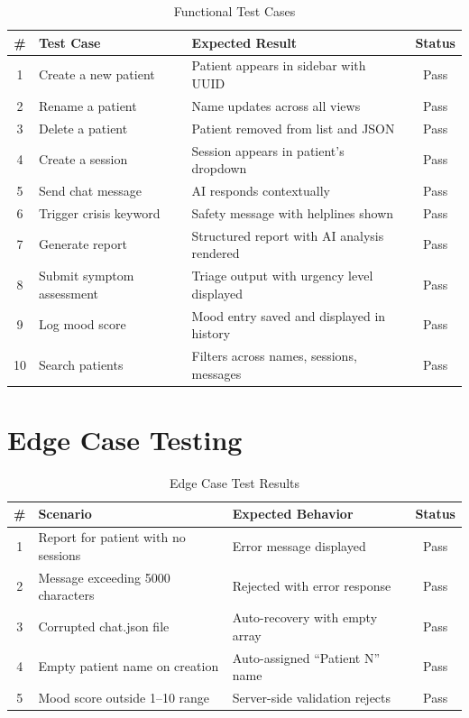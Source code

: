 \documentclass[12pt,a4paper]{report}
\begin{document}
\begin{table}[h!]
\centering
\caption{Functional Test Cases}
\begin{tabularx}{\textwidth}{|c|X|X|c|}
\hline
\textbf{\#} & \textbf{Test Case} & \textbf{Expected Result} & \textbf{Status} \\
\hline
1 & Create a new patient & Patient appears in sidebar with UUID & Pass \\
\hline
2 & Rename a patient & Name updates across all views & Pass \\
\hline
3 & Delete a patient & Patient removed from list and JSON & Pass \\
\hline
4 & Create a session & Session appears in patient's dropdown & Pass \\
\hline
5 & Send chat message & AI responds contextually & Pass \\
\hline
6 & Trigger crisis keyword & Safety message with helplines shown & Pass \\
\hline
7 & Generate report & Structured report with AI analysis rendered & Pass \\
\hline
8 & Submit symptom assessment & Triage output with urgency level displayed & Pass \\
\hline
9 & Log mood score & Mood entry saved and displayed in history & Pass \\
\hline
10 & Search patients & Filters across names, sessions, messages & Pass \\
\hline
\end{tabularx}
\end{table}

\section{Edge Case Testing}

\begin{table}[h!]
\centering
\caption{Edge Case Test Results}
\begin{tabularx}{\textwidth}{|c|X|X|c|}
\hline
\textbf{\#} & \textbf{Scenario} & \textbf{Expected Behavior} & \textbf{Status} \\
\hline
1 & Report for patient with no sessions & Error message displayed & Pass \\
\hline
2 & Message exceeding 5000 characters & Rejected with error response & Pass \\
\hline
3 & Corrupted chat.json file & Auto-recovery with empty array & Pass \\
\hline
4 & Empty patient name on creation & Auto-assigned ``Patient N'' name & Pass \\
\hline
5 & Mood score outside 1--10 range & Server-side validation rejects & Pass \\
\hline
\end{tabularx}
\end{table}
\end{document}
